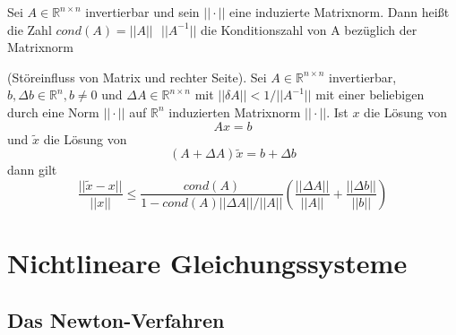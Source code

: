 \documentclass[
	ngerman,
	accentcolor=9c,%
	type=intern,
	marginpar=false
	]{tudapub}
\begin{document}
            \begin{definition}
                Sei $A \in \mathbb{R}^{n\times n}$ invertierbar und sein $|| \cdot||$ eine induzierte Matrixnorm. Dann heißt die Zahl $cond(A) = ||A||\mbox{ }||A^{-1}||$ die Konditionszahl von A bezüglich der Matrixnorm
            \end{definition}
            \begin{satz}
                (Störeinfluss von Matrix und rechter Seite). Sei $A \in \mathbb{R}^{n \times n}$ invertierbar, $b,\Delta b \in \mathbb{R}^n, b \not = 0$ und $\Delta A \in \mathbb{R}^{n \times n}$ mit $||\delta A|| < 1/ ||A^{-1}||$
                mit einer beliebigen durch eine Norm $||\cdot||$ auf $\mathbb{R}^n$ induzierten Matrixnorm $||\cdot||$.
                Ist $x$ die Lösung von
                \begin{equation*}
                    Ax = b
                \end{equation*}
                und $\tilde{x}$ die Lösung von 
                \begin{equation*}
                    (A+ \Delta A)\tilde{x} = b + \Delta b
                \end{equation*}
                dann gilt
                \begin{equation*}
                    \dfrac{||\tilde{x} - x||}{||x||} \leq \dfrac{cond(A)}{1-cond(A)||\Delta A|| / ||A||} \left(\dfrac{||\Delta A||}{||A||} + \dfrac{|| \Delta b||}{||b||}\right)
                \end{equation*}
            \end{satz}
            \newpage
    \section{Nichtlineare Gleichungssysteme}
            \subsection{Das Newton-Verfahren}
\end{document}
